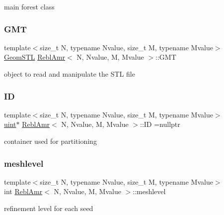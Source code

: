 main forest class \mbox{\label{classReblAmr_a578fdac81e33fdc2098a77aa284a419c}} 
\subsubsection{\texorpdfstring{G\+MT}{GMT}}
{\footnotesize\ttfamily template$<$size\+\_\+t N, typename Nvalue, size\+\_\+t M, typename Mvalue$>$ \\
\mbox{\hyperlink{classGeomSTL}{Geom\+S\+TL}} \mbox{\hyperlink{classReblAmr}{Rebl\+Amr}}$<$ N, Nvalue, M, Mvalue $>$\+::G\+MT\hspace{0.3cm}{\ttfamily [private]}}

object to read and manipulate the S\+TL file \mbox{\label{classReblAmr_a89c3a7a5caa752d480fddeab19696eb3}} 
\subsubsection{\texorpdfstring{ID}{ID}}
{\footnotesize\ttfamily template$<$size\+\_\+t N, typename Nvalue, size\+\_\+t M, typename Mvalue$>$ \\
\mbox{\hyperlink{definitions_8h_a69aa29b598b851b0640aa225a9e5d61d}{uint}}$\ast$ \mbox{\hyperlink{classReblAmr}{Rebl\+Amr}}$<$ N, Nvalue, M, Mvalue $>$\+::ID =nullptr\hspace{0.3cm}{\ttfamily [private]}}

container used for partitioning \mbox{\label{classReblAmr_ac79b3649d10d28063e96be4144c4560a}} 
\subsubsection{\texorpdfstring{meshlevel}{meshlevel}}
{\footnotesize\ttfamily template$<$size\+\_\+t N, typename Nvalue, size\+\_\+t M, typename Mvalue$>$ \\
int \mbox{\hyperlink{classReblAmr}{Rebl\+Amr}}$<$ N, Nvalue, M, Mvalue $>$\+::meshlevel\hspace{0.3cm}{\ttfamily [private]}}

refinement level for each seed \mbox{\label{classReblAmr_a26e32330b066f45fe5e12f65d92e3fc3}} 

